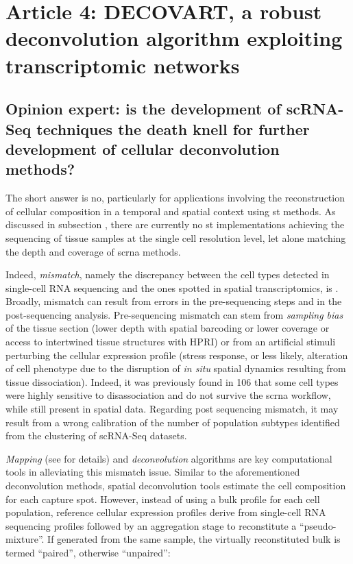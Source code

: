 \chapter[DeCovarT: a holistic Bayesian network][DeCovarT: a holistic Bayesian network]{Article 4: DECOVART, a robust deconvolution algorithm exploiting transcriptomic networks}
\label{chap:decovart-algo}



\section[Deconvolution perspectives][Deconvolution perspectives]{Opinion expert: is the development of scRNA-Seq techniques the death knell for further development of cellular deconvolution methods?}
\label{sec:perspective-deconvolution}

The short answer is no, particularly for applications involving the reconstruction of cellular composition in a temporal and spatial context using \acrfull{st} methods. As discussed in subsection , there are currently no \acrshort{st} implementations achieving the sequencing of tissue samples at the single cell resolution level, let alone matching the depth and coverage of \acrshort{scrna} methods. 

Indeed, \emph{mismatch}, namely the discrepancy between the cell types detected in single-cell RNA sequencing and the ones spotted in spatial transcriptomics, is . Broadly, mismatch can result from errors in the pre-sequencing steps and in the post-sequencing analysis. Pre-sequencing mismatch can stem from \textit{sampling bias} of the tissue section (lower depth with spatial barcoding or lower coverage or access to intertwined tissue structures with HPRI) or from an artificial stimuli perturbing the cellular expression profile (stress response, or less likely, alteration of cell phenotype due to the disruption of \textit{in situ} spatial dynamics resulting from tissue dissociation). Indeed, it was previously found in 106 that some cell types were highly sensitive to disassociation and do not survive the \acrshort{scrna} workflow, while still present in spatial data. Regarding post sequencing mismatch, it may result from a wrong calibration of the number of population subtypes identified from the clustering of scRNA-Seq datasets.


\emph{Mapping} (see  for details) and \emph{deconvolution} algorithms are key computational tools in alleviating this mismatch issue.
Similar to the aforementioned deconvolution methods, spatial deconvolution tools estimate the cell composition for each capture spot. However, instead of using a bulk profile for each cell population, reference cellular expression profiles derive from single-cell RNA sequencing profiles followed by an aggregation stage to reconstitute a \enquote{pseudo-mixture}. If generated from the same sample, the virtually reconstituted bulk is termed \enquote{paired}, otherwise \enquote{unpaired}:

